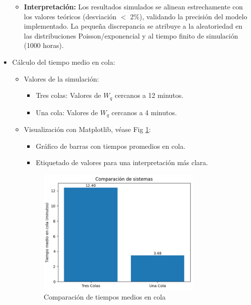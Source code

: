 \documentclass{article}
\begin{document}
\begin{itemize}
\begin{itemize}
            \item \textbf{Interpretación:} Los resultados simulados se alinean estrechamente con los valores 
            teóricos (desviación $<$ 2\%), validando la precisión del modelo implementado. La pequeña 
            discrepancia se atribuye a la aleatoriedad en las distribuciones Poisson/exponencial y al 
            tiempo finito de simulación (1000 horas).    
        \end{itemize}

    \item Cálculo del tiempo medio en cola:
        \begin{itemize}
            \item Valores de la simulación:
                \begin{itemize}
                    \item Tres colas: Valores de $W_q$ cercanos a 12 minutos.
                    \item Una cola: Valores de $W_q$ cercanos a 4 minutos.
                \end{itemize}

            \item Visualización con Matplotlib, véase Fig \ref{fig:tiempo_cola}:
                \begin{itemize}
                    \item Gráfico de barras con tiempos promedios en cola.
                    \item Etiquetado de valores para una interpretación más clara.
                \end{itemize}
                \begin{figure}[h]
                    \centering
                    \includegraphics[width=0.8\textwidth]{./images/Tiempo medio en cola.png}
                    \caption{Comparación de tiempos medios en cola}
                    \label{fig:tiempo_cola}
                \end{figure}


\end{itemize}
\end{itemize}
\end{document}
